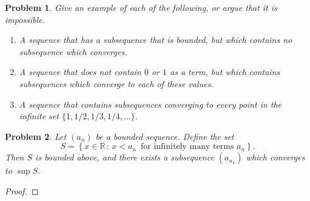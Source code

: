 \documentclass[12pt]{article}
\newtheorem{problem}{Problem}
\newcommand{\RR}{\ensuremath{\mathbb R}}
\begin{document}
\begin{problem} %
Give an example of each of the following, or argue that it is impossible.

\renewcommand{\labelenumi}{(\alph{enumi})}
\begin{enumerate}
\item A sequence that has a subsequence that is bounded, but which contains no subsequence which converges.


\item A sequence that does not contain $0$ or $1$ as a term, but which contains subsequences which converge to each of these values.


\item A sequence that contains subsequences converging to every point in the infinite set $\{1,1/2,1/3,1/4,\dots\}$.


\end{enumerate}
\end{problem}


\begin{problem} %
Let $(a_n)$ be a bounded sequence.  Define the set
	$$S = \left\{x\in\RR\,:\, x < a_n \,\text{ for infinitely many terms } a_n\right\}.$$
Then $S$ is bounded above, and there exists a subsequence $(a_{n_k})$ which converges to $\sup S$.
\end{problem}

\begin{proof}
\end{proof}
\end{document}
